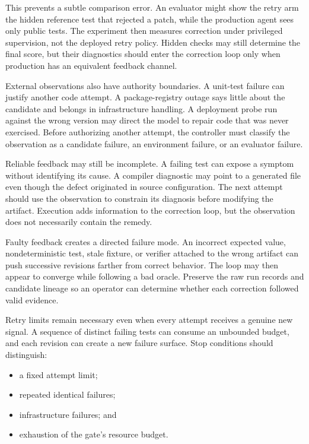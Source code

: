 This prevents a subtle comparison error. An evaluator might show the retry arm the hidden reference test that rejected a patch, while the production agent sees only public tests. The experiment then measures correction under privileged supervision, not the deployed retry policy. Hidden checks may still determine the final score, but their diagnostics should enter the correction loop only when production has an equivalent feedback channel.

External observations also have authority boundaries. A unit-test failure can justify another code attempt. A package-registry outage says little about the candidate and belongs in infrastructure handling. A deployment probe run against the wrong version may direct the model to repair code that was never exercised. Before authorizing another attempt, the controller must classify the observation as a candidate failure, an environment failure, or an evaluator failure.

Reliable feedback may still be incomplete. A failing test can expose a symptom without identifying its cause. A compiler diagnostic may point to a generated file even though the defect originated in source configuration. The next attempt should use the observation to constrain its diagnosis before modifying the artifact. Execution adds information to the correction loop, but the observation does not necessarily contain the remedy.

Faulty feedback creates a directed failure mode. An incorrect expected value, nondeterministic test, stale fixture, or verifier attached to the wrong artifact can push successive revisions farther from correct behavior. The loop may then appear to converge while following a bad oracle. Preserve the raw run records and candidate lineage so an operator can determine whether each correction followed valid evidence.


Retry limits remain necessary even when every attempt receives a genuine new signal. A sequence of distinct failing tests can consume an unbounded budget, and each revision can create a new failure surface. Stop conditions should distinguish:

\begin{itemize}
\tightlist
\item
  a fixed attempt limit;
\item
  repeated identical failures;
\item
  infrastructure failures; and
\item
  exhaustion of the gate's resource budget.
\end{itemize}

